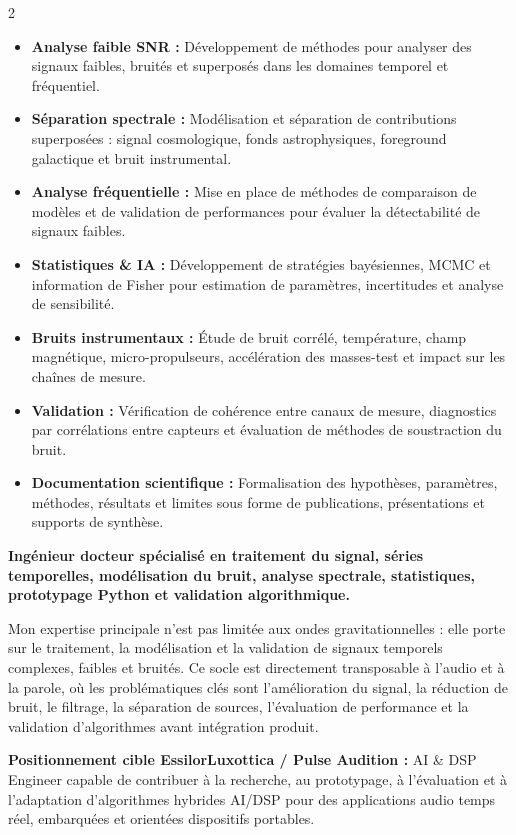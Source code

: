 \documentclass[8pt,a4paper,ragged2e,withhyper]{altacv}
\begin{document}
\begin{paracol}{2}
\begin{itemize}
  \item \textbf{Analyse faible SNR :} Développement de méthodes pour analyser des signaux faibles, bruités et superposés dans les domaines temporel et fréquentiel.
  \item \textbf{Séparation spectrale :} Modélisation et séparation de contributions superposées : signal cosmologique, fonds astrophysiques, foreground galactique et bruit instrumental.
  \item \textbf{Analyse fréquentielle :} Mise en place de méthodes de comparaison de modèles et de validation de performances pour évaluer la détectabilité de signaux faibles.
  \item \textbf{Statistiques \& IA :} Développement de stratégies bayésiennes, MCMC et information de Fisher pour estimation de paramètres, incertitudes et analyse de sensibilité.
  \item \textbf{Bruits instrumentaux :} Étude de bruit corrélé, température, champ magnétique, micro-propulseurs, accélération des masses-test et impact sur les chaînes de mesure.
  \item \textbf{Validation :} Vérification de cohérence entre canaux de mesure, diagnostics par corrélations entre capteurs et évaluation de méthodes de soustraction du bruit.
  \item \textbf{Documentation scientifique :} Formalisation des hypothèses, paramètres, méthodes, résultats et limites sous forme de publications, présentations et supports de synthèse.
\end{itemize}

\switchcolumn


\textbf{Ingénieur docteur spécialisé en traitement du signal, séries temporelles, modélisation du bruit, analyse spectrale, statistiques, prototypage Python et validation algorithmique.}

Mon expertise principale n’est pas limitée aux ondes gravitationnelles : elle porte sur le traitement, la modélisation et la validation de signaux temporels complexes, faibles et bruités. Ce socle est directement transposable à l’audio et à la parole, où les problématiques clés sont l’amélioration du signal, la réduction de bruit, le filtrage, la séparation de sources, l’évaluation de performance et la validation d’algorithmes avant intégration produit.

\medskip

\textbf{Positionnement cible EssilorLuxottica / Pulse Audition :} AI \& DSP Engineer capable de contribuer à la recherche, au prototypage, à l’évaluation et à l’adaptation d’algorithmes hybrides AI/DSP pour des applications audio temps réel, embarquées et orientées dispositifs portables.


\end{paracol}
\end{document}
